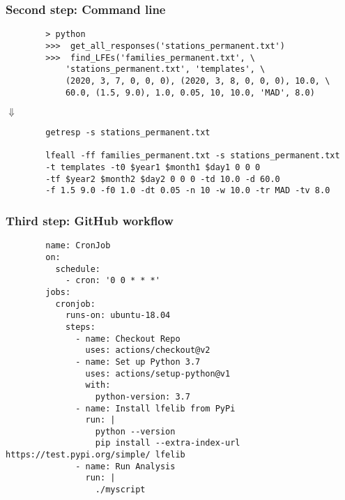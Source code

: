 \documentclass{beamer}
\begin{document}
	\begin{frame}[fragile]
		\frametitle{Second step: Command line}
		\begin{exampleblock}{}
		\scriptsize{
		\begin{lstlisting}
		> python
		>>>  get_all_responses('stations_permanent.txt')
		>>>  find_LFEs('families_permanent.txt', \
		    'stations_permanent.txt', 'templates', \
		    (2020, 3, 7, 0, 0, 0), (2020, 3, 8, 0, 0, 0), 10.0, \
		    60.0, (1.5, 9.0), 1.0, 0.05, 10, 10.0, 'MAD', 8.0)
		\end{lstlisting}
		}
		\end{exampleblock}

		\centering
		\Huge{
		$\Downarrow$
		}

		\begin{exampleblock}{}
		\scriptsize{
		\begin{verbatim}
		getresp -s stations_permanent.txt

		lfeall -ff families_permanent.txt -s stations_permanent.txt 
		-t templates -t0 $year1 $month1 $day1 0 0 0
		-tf $year2 $month2 $day2 0 0 0 -td 10.0 -d 60.0
		-f 1.5 9.0 -f0 1.0 -dt 0.05 -n 10 -w 10.0 -tr MAD -tv 8.0
		\end{verbatim}
		}
		\end{exampleblock}
	\end{frame}

	\begin{frame}[fragile]
		\frametitle{Third step: GitHub workflow}
		\begin{exampleblock}{}
		\tiny{
		\begin{verbatim}
		name: CronJob
		on:
		  schedule:
		    - cron: '0 0 * * *'
		jobs:
		  cronjob:
		    runs-on: ubuntu-18.04
		    steps:
		      - name: Checkout Repo
		        uses: actions/checkout@v2
		      - name: Set up Python 3.7
		        uses: actions/setup-python@v1
		        with:
		          python-version: 3.7
		      - name: Install lfelib from PyPi
		        run: |
		          python --version
		          pip install --extra-index-url https://test.pypi.org/simple/ lfelib
		      - name: Run Analysis
		        run: |
		          ./myscript
		\end{verbatim}
		}
		\end{exampleblock}
	\end{frame}
\end{document}
